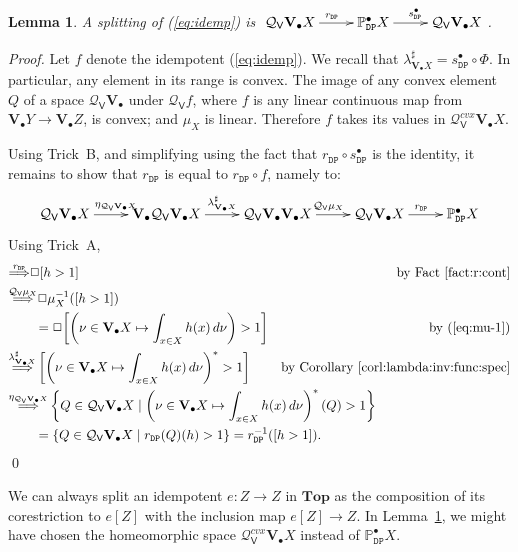 \documentclass[preprint,12pt]{elsarticle}
\newcommand\Pred{\mathbb{P}}
\newcommand\Demon{{\mathtt{D}}}
\newcommand\Nature{{\mathtt{P}}}
\newcommand\DN{{\Demon\Nature}}
\newcommand\invto[1]{{\buildrel {#1} \over\Longrightarrow}}
\newcommand\Smyth{{\mathcal Q}}
\newcommand\Vt{\mathsf{V}}
\newcommand\SV{\Smyth_{\Vt}}
\newcommand\Val{{\mathbf V}}
\newcommand\Topcat{\mathbf{Top}}
\newtheorem{lemma}[theorem]{Lemma}
\begin{document}
\begin{lemma}
  \label{lemma:idemp:split}
  A splitting of (\ref{eq:idemp}) is
  $\xymatrix{\SV {\Val_\bullet X} \ar[r]^{r_\DN} & \Pred_\DN^\bullet X
    \ar[r]^{s_\DN^\bullet} & \SV {\Val_\bullet X}}$.
\end{lemma}
\begin{proof}
  Let $f$ denote the idempotent (\ref{eq:idemp}).  We recall that
  $\lambda^\sharp_{\Val_\bullet X} = s_\DN^\bullet \circ \Phi$.  In
  particular, any element in its range is convex.  The image of any
  convex element $Q$ of a space $\SV {\Val_\bullet}$ under $\SV f$,
  where $f$ is any linear continuous map from
  $\Val_\bullet Y \to \Val_\bullet Z$, is convex; and $\mu_X$ is
  linear.  Therefore $f$ takes its values in
  $\SV^{cvx} {\Val_\bullet X}$.

  Using Trick~B, and simplifying using the fact that $r_\DN \circ
  s_\DN^\bullet$ is the identity, it remains to show that $r_\DN$ is
  equal to $r_\DN \circ f$, namely to:
  \[
    \xymatrix{
      \SV {\Val_\bullet X} \ar[r]^{\eta_{\SV {\Val_\bullet X}}}
      & \Val_\bullet {\SV {\Val_\bullet X}}
      \ar[r]^{\lambda^\sharp_{\Val_\bullet X}}
      & \SV {\Val_\bullet {\Val_\bullet X}}
      \ar[r]^{\SV {\mu_X}}
      & \SV {\Val_\bullet X}
      \ar[r]^{r_\DN}
      & \Pred_\DN^\bullet X
    }
  \]
  Using Trick~A,
  \begin{align*}
    [h > 1]
    & \invto{r_\DN}
      \Box {[h > 1]}
    & \text{by Fact~\ref{fact:r:cont}} \\
    & \invto{\SV {\mu_X}}
      \Box {\mu_X^{-1} ([h > 1])} \\
    & \qquad= \Box {\left[\left(\nu \in \Val_\bullet X \mapsto \int_{x \in
      X} h (x) \,d\nu\right) > 1\right]}
    & \text{by (\ref{eq:mu-1})} \\
    & \invto{\lambda^\sharp_{\Val_\bullet X}}
      \left[\left(\nu \in \Val_\bullet X \mapsto \int_{x \in
      X} h (x) \,d\nu\right)^* > 1\right]
    & \text{by Corollary~\ref{corl:lambda:inv:func:spec}} \\
    & \invto{\eta_{\SV {\Val_\bullet X}}}
      \left\{Q \in \SV {\Val_\bullet X} \mid \left(\nu \in \Val_\bullet X \mapsto \int_{x \in
      X} h (x) \,d\nu\right)^* (Q) > 1\right\}
    \mskip-360mu \\
    & \qquad= \left\{Q \in \SV {\Val_\bullet X} \mid r_\DN (Q) (h) > 1 \right\}
      = r_\DN^{-1} ([h > 1]).
      \mskip-250mu
  \end{align*}
  \qed
\end{proof}
We can always split an idempotent $e \colon Z \to Z$ in $\Topcat$ as
the composition of its corestriction to $e [Z]$ with the inclusion map
$e [Z] \to Z$.  In Lemma~\ref{lemma:idemp:split}, we might have chosen
the homeomorphic space $\SV^{cvx} {\Val_\bullet X}$ instead of
$\Pred_\DN^\bullet X$.
\end{document}
